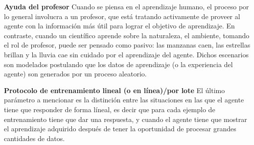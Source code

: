 \textbf{Ayuda del profesor} Cuando se piensa en el aprendizaje humano,
el proceso por lo general involucra a un profesor, que
está tratando activamente de proveer al agente con la información más útil
para lograr el objetivo de aprendizaje. En contraste, cuando un científico
aprende sobre la naturaleza, el ambiente, tomando el rol de profesor,
puede ser pensado como pasivo: las manzanas caen, las estrellas
brillan y la lluvia cae sin cuidado por el aprendizaje del agente.
Dichos escenarios son modelados postulando que los datos de aprendizaje
(o la experiencia del agente) son generados por un proceso aleatorio.

\textbf{Protocolo de entrenamiento lineal (o en línea)/por lote} El
último parámetro a mencionar es la distinción entre las situaciones en
las que el agente tiene que responder de forma líneal, es decir
que para cada ejemplo de entrenamiento tiene que dar una respuesta, y
cuando el agente tiene que mostrar el aprendizaje adquirido
después de tener la oportunidad de procesar grandes cantidades de datos.
